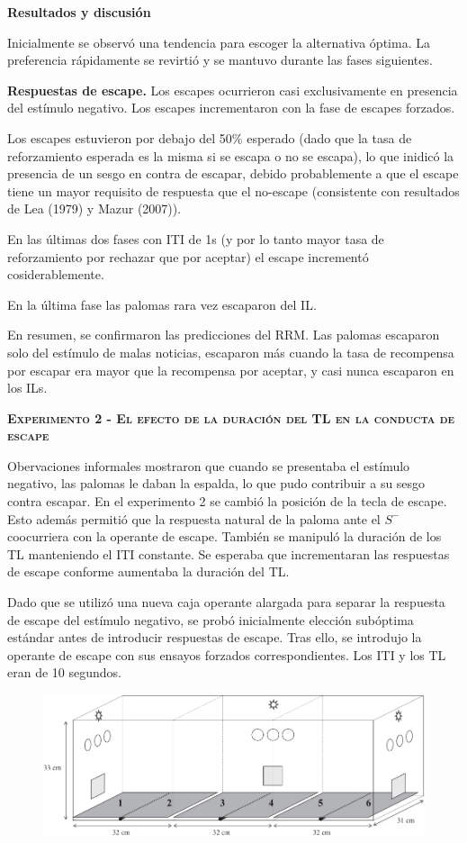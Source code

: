 \documentclass[a4paper,12pt]{article}
\begin{document}
{\bfseries Resultados y discusión}

Inicialmente se observó una tendencia para escoger la alternativa óptima. La preferencia rápidamente se revirtió y se mantuvo durante las fases siguientes.

{\bfseries Respuestas de escape.} Los escapes ocurrieron casi exclusivamente en presencia del estímulo negativo. Los escapes incrementaron con la fase de escapes forzados.

Los escapes estuvieron por debajo del 50\% esperado (dado que la tasa de reforzamiento esperada es la misma si se escapa o no se escapa), lo que inidicó la presencia de un sesgo en contra de escapar, debido probablemente a que el escape tiene un mayor requisito de respuesta que el no-escape (consistente con resultados de Lea (1979) y Mazur (2007)).

En las últimas dos fases con ITI de 1s (y por lo tanto mayor tasa de reforzamiento por rechazar que por aceptar) el escape incrementó cosiderablemente.

En la última fase las palomas rara vez escaparon del IL.

En resumen, se confirmaron las predicciones del RRM. Las palomas escaparon solo del estímulo de malas noticias, escaparon más cuando la tasa de recompensa por escapar era mayor que la recompensa por aceptar, y casi nunca escaparon en los ILs.

{\scshape\bfseries Experimento 2 -  El efecto de la duración del TL en la conducta de escape}

Obervaciones informales mostraron que cuando se presentaba el estímulo negativo, las palomas le daban la espalda, lo que pudo contribuir a su sesgo contra escapar. En el experimento 2 se cambió la posición de la tecla de escape. Esto además permitió que la respuesta natural de la paloma ante el $S^-$ coocurriera con la operante de escape. También se manipuló la duración de los TL manteniendo el ITI constante. Se esperaba que incrementaran las respuestas de escape conforme aumentaba la duración del TL.

Dado que se utilizó una nueva caja operante alargada para separar la respuesta de escape del estímulo negativo, se probó inicialmente elección subóptima estándar antes de introducir respuestas de escape. Tras ello, se introdujo la operante de escape con sus ensayos forzados correspondientes. Los ITI y los TL eran de 10 segundos.

\begin{figure}[ht]
	\begin{center}
		\includegraphics[scale=0.5]{Fortes.png}
	\end{center}
\end{figure}	
\end{document}
